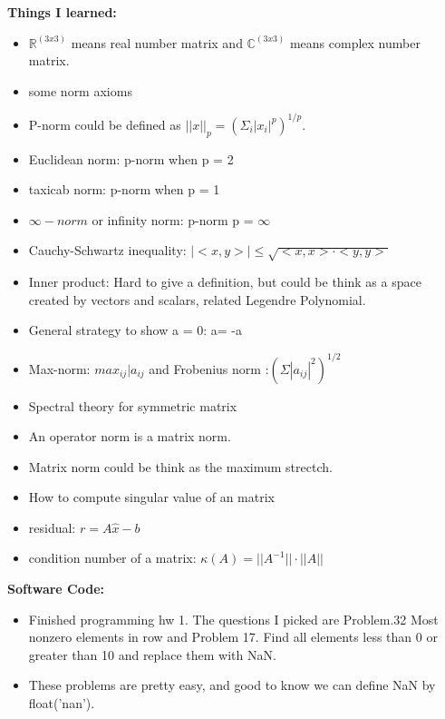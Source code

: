 \documentclass{article}
\begin{document}
\textbf{Things I learned:}
\begin{itemize}
\item $\mathbb{R}^{(3x3)}$ means real number matrix and $\mathbb{C}^{(3x3)}$ means complex number matrix.
\item some norm axioms
\item P-norm  could be defined as $||x||_p = (\Sigma_i|x_i|^p)^{1/p}$.
\item Euclidean norm: p-norm when p = 2
\item taxicab norm: p-norm when p = 1
\item $\infty-norm$ or infinity norm: p-norm p = $\infty$
\item Cauchy-Schwartz inequality: $|<x,y>| \leq \sqrt{<x,x> \cdot <y,y>}$
\item Inner product: Hard to give a definition, but could be think as a space created by vectors and scalars, related Legendre Polynomial.
\item General strategy to show a = 0: a= -a
\item Max-norm: $max_{ij}|a_{ij}$ and Frobenius norm :$(\Sigma |a_{ij}|^2)^{1/2}$
\item Spectral theory for symmetric matrix
\item An operator norm is a matrix norm.
\item Matrix norm could be think as the maximum strectch.
\item How to compute singular value of an matrix
\item residual: $r = A \hat{x}- b$  
\item condition number of a matrix: $\kappa(A) = ||A^{-1}|| \cdot ||A||$
\end{itemize}

\textbf{Software Code:}
\begin{itemize}
\item Finished programming hw 1. The questions I picked are Problem.32  Most nonzero elements in row  and Problem 17. Find all elements less than 0 or greater than 10 and replace them with NaN. 
\item These problems are pretty easy, and good to know we can define NaN by float('nan').
\end{itemize}
\end{document}
